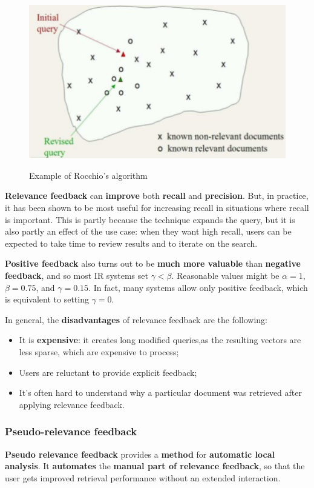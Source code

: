 \begin{figure}[h!]
		\centering
		\includegraphics[scale = 2.0]{img/rocchio2.jpg}
		\label{rocchio2}
        \caption{Example of Rocchio's algorithm}
\end{figure}

\textbf{Relevance feedback} can \textbf{improve} both \textbf{recall} and \textbf{precision}. But, in practice, it has been shown to be most useful for increasing recall in situations where recall is important. This is partly because the technique expands the query, but it is also partly an effect of the use case: when they want high recall, users can be expected to take time to review results and to iterate on the search. 

\textbf{Positive feedback} also turns out to be \textbf{much more valuable} than \textbf{negative feedback}, and so most IR systems set $\gamma < \beta$. Reasonable values might be $\alpha = 1$, $\beta = 0.75$, and $\gamma = 0.15$. In fact, many systems allow only positive feedback, which is equivalent to setting $\gamma = 0$. 

In general, the \textbf{disadvantages} of relevance feedback are the following:

\begin{itemize}
    \item It is \textbf{expensive}: it creates long modified queries,as the resulting vectors are less sparse, which are expensive to process;
    \item Users are reluctant to provide explicit feedback;
    \item It's often hard to understand why a particular document was retrieved after applying relevance feedback.
\end{itemize}

\subsubsection{Pseudo-relevance feedback}
\textbf{Pseudo relevance feedback} provides a \textbf{method} for \textbf{automatic local analysis}. It \textbf{automates} the \textbf{manual part of relevance feedback}, so that the user gets improved retrieval performance without an extended interaction. 

